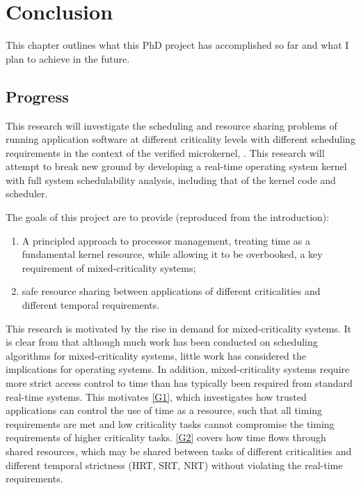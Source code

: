 \chapter{Conclusion}
\label{chap:conclusion}

This chapter outlines what this PhD project has accomplished so far and what I plan to achieve in the future.

\section{Progress}

This research will investigate the scheduling and resource sharing problems of running application software at different criticality levels with different scheduling requirements in the context of the verified microkernel, \selfour.
This research will attempt to break new ground by developing a real-time operating system kernel with full system schedulability analysis, including that of the kernel code and scheduler.

The goals of this project are to provide (reproduced from the introduction):

\begin{enumerate}[label=\textbf{G\arabic*}]
  \item \label{G1} A principled approach to processor management, treating time as a fundamental kernel resource, while allowing it to be overbooked, a key requirement of mixed-criticality systems;
  \item \label{G2} safe resource sharing between applications of different criticalities and different temporal requirements.
\end{enumerate}

This research is motivated by the rise in demand for mixed-criticality systems.
It is clear from  that although much work has been conducted on scheduling algorithms for mixed-criticality systems, little work has considered the implications for operating systems.
In addition, mixed-criticality systems require more strict access control to time than has typically been required from standard real-time systems.
This motivates \ref{G1}, which investigates how trusted applications can control the use of time as a resource, such that all timing requirements are met and low criticality tasks cannot compromise the timing requirements of higher criticality tasks.
\ref{G2} covers how time flows through shared resources, which may be shared between tasks of different criticalities and different temporal strictness (\gls{HRT}, \gls{SRT}, \gls{NRT}) without violating the real-time requirements.

